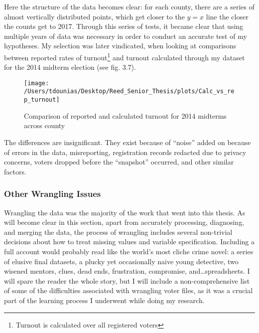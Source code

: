\documentclass[]{article}
\let\rmarkdownfootnote\footnote%
\def\footnote{\protect\rmarkdownfootnote}
\begin{document}
Here the structure of the data becomes clear: for each county, there are
a series of almost vertically distributed points, which get closer to
the \(y=x\) line the closer the counts get to 2017. Through this series
of tests, it became clear that using multiple years of data was
necessary in order to conduct an accurate test of my hypotheses. My
selection was later vindicated, when looking at comparisons between
reported rates of turnout\footnote{Turnout is calculated over all
  registered voters} and turnout calculated through my dataset for the
2014 midterm election (see fig. 3.7).

\begin{figure}

{\centering \texttt{[image: /Users/tdounias/Desktop/Reed\_Senior\_Thesis/plots/Calc\_vs\_rep\_turnout]} 

}

\caption{Comparison of reported and calculated turnout for 2014 midterms across county}\label{fig:comp turnout 2014}
\end{figure}

The differences are insignificant. They exist because of ``noise'' added
on because of errors in the data, misreporting, registration records
redacted due to privacy concerns, voters dropped before the ``snapshot''
occurred, and other similar factors.

\subsubsection{Other Wrangling Issues}\label{other-wrangling-issues}

Wrangling the data was the majority of the work that went into this
thesis. As will become clear in this section, apart from accurately
processing, diagnosing, and merging the data, the process of wrangling
includes several non-trivial decisions about how to treat missing values
and variable specification. Including a full account would probably read
like the world's most cliche crime novel: a series of elusive final
datasets, a plucky yet occasionally naive young detective, two wisened
mentors, clues, dead ends, frustration, compromise,
and\ldots{}spreadsheets. I will spare the reader the whole story, but I
will include a non-comprehensive list of some of the difficulties
associated with wrangling voter files, as it was a crucial part of the
learning process I underwent while doing my research.
\end{document}
